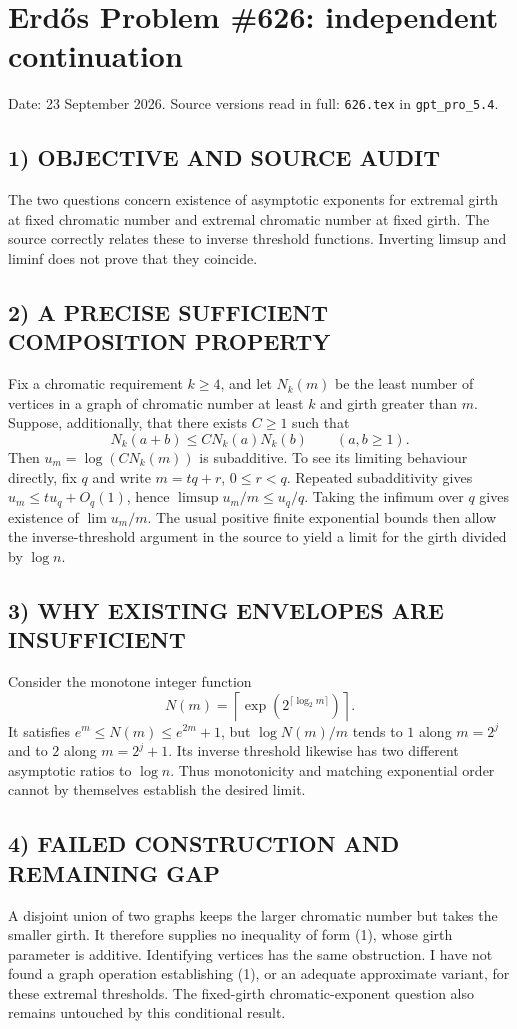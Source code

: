 \section{Erd\H{o}s Problem \#626: independent continuation}
\noindent Date: 23 September 2026. Source versions read in full: \texttt{626.tex} in \texttt{gpt\_pro\_5.4}.

\subsection*{1) OBJECTIVE AND SOURCE AUDIT}
The two questions concern existence of asymptotic exponents for extremal girth at fixed chromatic number and extremal chromatic number at fixed girth. The source correctly relates these to inverse threshold functions. Inverting limsup and liminf does not prove that they coincide.
\subsection*{2) A PRECISE SUFFICIENT COMPOSITION PROPERTY}
Fix a chromatic requirement $k\ge4$, and let $N_k(m)$ be the least number of vertices in a graph of chromatic number at least $k$ and girth greater than $m$. Suppose, additionally, that there exists $C\ge1$ such that
\[
N_k(a+b)\le C N_k(a)N_k(b)\qquad(a,b\ge1). \tag{1}
\]
Then $u_m=\log(CN_k(m))$ is subadditive. To see its limiting behaviour directly, fix $q$ and write $m=tq+r$, $0\le r<q$. Repeated subadditivity gives $u_m\le t u_q+O_q(1)$, hence $\limsup u_m/m\le u_q/q$. Taking the infimum over $q$ gives existence of $\lim u_m/m$. The usual positive finite exponential bounds then allow the inverse-threshold argument in the source to yield a limit for the girth divided by $\log n$.
\subsection*{3) WHY EXISTING ENVELOPES ARE INSUFFICIENT}
Consider the monotone integer function
\[
N(m)=\left\lceil\exp(2^{\lceil\log_2m\rceil})\right\rceil.
\]
It satisfies $e^m\le N(m)\le e^{2m}+1$, but $\log N(m)/m$ tends to $1$ along $m=2^j$ and to $2$ along $m=2^j+1$. Its inverse threshold likewise has two different asymptotic ratios to $\log n$. Thus monotonicity and matching exponential order cannot by themselves establish the desired limit.
\subsection*{4) FAILED CONSTRUCTION AND REMAINING GAP}
A disjoint union of two graphs keeps the larger chromatic number but takes the smaller girth. It therefore supplies no inequality of form (1), whose girth parameter is additive. Identifying vertices has the same obstruction. I have not found a graph operation establishing (1), or an adequate approximate variant, for these extremal thresholds. The fixed-girth chromatic-exponent question also remains untouched by this conditional result.
